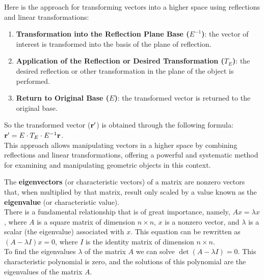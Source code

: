 \documentclass[10pt,a4paper]{Template}
\begin{document}
\null\newpage

\thispagestyle{empty}

\begin{minipage}{0.48\textwidth}

Here is the approach for transforming vectors into a higher space using reflections and linear transformations:
\begin{enumerate}[topsep=2.5pt]
    \item \textbf{Transformation into the Reflection Plane Base ($E^{-1}$)}: the vector of interest is transformed into the basis of the plane of reflection.
    \item \textbf{Application of the Reflection or Desired Transformation ($T_E$)}: the desired reflection or other transformation in the plane of the object is performed.
    \item \textbf{Return to Original Base ($E$)}: the transformed vector is returned to the original base.
\end{enumerate}
So the transformed vector ($\mathbf{r}'$) is obtained through the following formula: $\mathbf{r}' = E \cdot T_E \cdot E^{-1} \mathbf{r}$. \\

This approach allows manipulating vectors in a higher space by combining reflections and linear transformations, offering a powerful and systematic method for examining and manipulating geometric objects in this context.

\vspace{0.5cm}

\topic[Eigenstuff]
The \textbf{eigenvectors} (or characteristic vectors) of a matrix are nonzero vectors that, when multiplied by that matrix, result only scaled by a value known as the \textbf{eigenvalue} (or characteristic value). \\

There is a fundamental relationship that is of great importance, namely, $A x=\lambda x$, where $A$ is a square matrix of dimension $n \times n$, $x$ is a nonzero vector, and $\lambda$ is a scalar (the eigenvalue) associated with $x$. This equation can be rewritten as $(A-\lambda I)x=0$, where $I$ is the identity matrix of dimension $n \times n$. \\

To find the eigenvalues $\lambda$ of the matrix $A$ we can solve $\det(A-\lambda I)=0$. This characteristic polynomial is zero, and the solutions of this polynomial are the eigenvalues of the matrix $A$. \\


\end{minipage}
\end{document}
